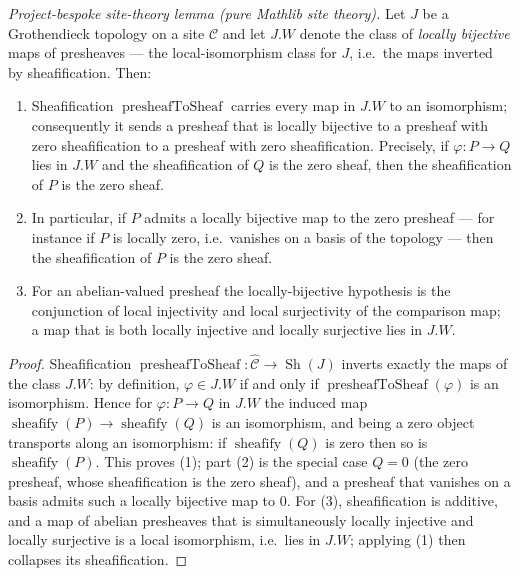 \begin{lemma}
  \label{mk-lem:sheafify_kills_locally_zero}

  \textit{Project-bespoke site-theory lemma (pure Mathlib site theory).}
  Let \(J\) be a Grothendieck topology on a site \(\mathcal{C}\) and let \(J.W\) denote the
  class of \emph{locally bijective} maps of presheaves --- the local-isomorphism class for
  \(J\), i.e.\ the maps inverted by sheafification. Then:
  \begin{enumerate}
    \item Sheafification \(\operatorname{presheafToSheaf}\) carries every map in \(J.W\) to an
      isomorphism; consequently it sends a presheaf that is locally bijective to a presheaf
      with zero sheafification to a presheaf with zero sheafification. Precisely, if
      \(\varphi : P \to Q\) lies in \(J.W\) and the sheafification of \(Q\) is the zero
      sheaf, then the sheafification of \(P\) is the zero sheaf.
    \item In particular, if \(P\) admits a locally bijective map to the zero presheaf --- for
      instance if \(P\) is locally zero, i.e.\ vanishes on a basis of the topology --- then
      the sheafification of \(P\) is the zero sheaf.
    \item For an abelian-valued presheaf the locally-bijective hypothesis is the conjunction
      of local injectivity and local surjectivity of the comparison map; a map that is both
      locally injective and locally surjective lies in \(J.W\).
  \end{enumerate}
\end{lemma}
\begin{proof}
  Sheafification \(\operatorname{presheafToSheaf} : \widehat{\mathcal{C}} \to
  \operatorname{Sh}(J)\) inverts exactly the maps of the class \(J.W\): by definition,
  \(\varphi \in J.W\) if and only if \(\operatorname{presheafToSheaf}(\varphi)\) is an
  isomorphism. Hence for \(\varphi : P \to Q\) in \(J.W\) the induced map
  \(\operatorname{sheafify}(P) \to \operatorname{sheafify}(Q)\) is an isomorphism, and
  being a zero object transports along an isomorphism: if \(\operatorname{sheafify}(Q)\)
  is zero then so is \(\operatorname{sheafify}(P)\). This proves (1); part (2) is the
  special case \(Q = 0\) (the zero presheaf, whose sheafification is the zero sheaf),
  and a presheaf that vanishes on a basis admits such a locally bijective map to \(0\).
  For (3), sheafification is additive, and a map of abelian presheaves that is
  simultaneously locally injective and locally surjective is a local isomorphism,
  i.e.\ lies in \(J.W\); applying (1) then collapses its sheafification.
\end{proof}

